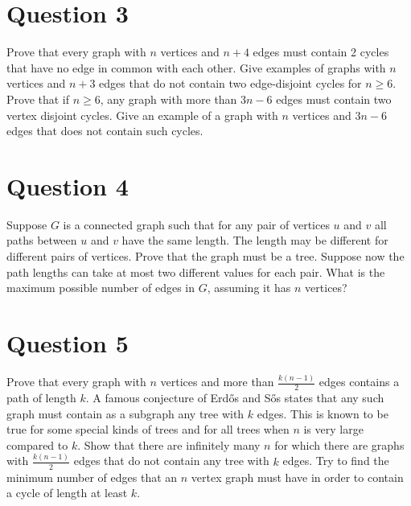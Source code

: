 \documentclass[12pt]{report}
\begin{document}
\section*{Question 3}
Prove that every graph with $n$ vertices and $n + 4$ edges must contain 2 cycles that have no edge in common with each other. Give examples of graphs with $n$ vertices and $n + 3$ edges that do not contain two edge-disjoint cycles for $n \geq 6$. Prove that if $n \geq 6$, any graph with more than $3n - 6$ edges must contain two vertex disjoint cycles. Give an example of a graph with $n$ vertices and $3n - 6$ edges that does not contain such cycles.
\section*{Question 4}
Suppose $G$ is a connected graph such that for any pair of vertices $u$ and $v$ all paths between $u$ and $v$ have the same length. The length may be different for different pairs of vertices. Prove that the graph must be a tree. Suppose now the path lengths can take at most two different values for each pair. What is the maximum possible number of edges in $G$, assuming it has $n$ vertices?
\section*{Question 5}
Prove that every graph with $n$ vertices and more than $\frac{k(n - 1)}{2}$ edges contains a path of length $k$. A famous conjecture of Erdős and Sős states that any such graph must contain as a subgraph any tree with $k$ edges. This is known to be true for some special kinds of trees and for all trees when $n$ is very large compared to $k$. Show that there are infinitely many $n$ for which there are graphs with $\frac{k(n - 1)}{2}$ edges that do not contain any tree with $k$ edges. Try to find the minimum number of edges that an $n$ vertex graph must have in order to contain a cycle of length at least $k$.
\end{document}
